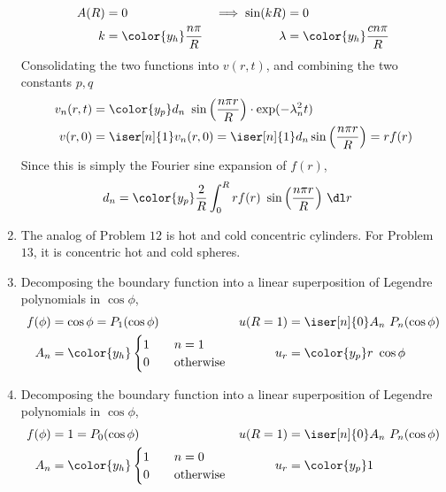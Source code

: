 \begin{enumerate}
\begin{align}
              A(R)              & = 0                           &
              \implies \sin(kR) & = 0                             \\
              k                 & = \color{y_h} \frac{n\pi}{R}  &
              \lambda           & = \color{y_h} \frac{cn\pi}{R}
          \end{align}
          Consolidating the two functions into $ v(r, t) $, and combining the two
          constants $ p, q $
          \begin{align}
              v_n(r, t) & = \color{y_p} d_n\ \sin\Big( \frac{n\pi r}{R}\Big) \cdot
              \exp(-\lambda_n^2 t)                                                 \\
              v(r, 0)   & = \iser[n]{1} v_n(r, 0) = \iser[n]{1} d_n \sin\Big(
              \frac{n\pi r}{R} \Big) = rf(r)
          \end{align}
          Since this is simply the Fourier sine expansion of $ f(r) $,
          \begin{align}
              d_n & = \color{y_p} \frac{2}{R} \int_{0}^{R} rf(r)
              \ \sin \Big( \frac{n\pi r}{R} \Big)\ \dl r
          \end{align}

    \item The analog of Problem $12$ is hot and cold concentric cylinders. For
          Problem $ 13 $, it is concentric hot and cold spheres.

    \item Decomposing the boundary function into a linear superposition of
          Legendre polynomials in $ \cos\phi $,
          \begin{align}
              f(\phi) & = \cos\phi = P_1(\cos\phi)       &
              u(R=1)  & = \iser[n]{0} A_n\ P_n(\cos\phi)         \\
              A_n     & = \color{y_h} \begin{cases}
                                          1 & \quad n = 1            \\
                                          0 & \quad \text{otherwise}
                                      \end{cases}    &
              u_r     & = \color{y_p} r\ \cos\phi
          \end{align}

    \item Decomposing the boundary function into a linear superposition of
          Legendre polynomials in $ \cos\phi $,
          \begin{align}
              f(\phi) & = 1 = P_0(\cos\phi)              &
              u(R=1)  & = \iser[n]{0} A_n\ P_n(\cos\phi)         \\
              A_n     & = \color{y_h} \begin{cases}
                                          1 & \quad n = 0            \\
                                          0 & \quad \text{otherwise}
                                      \end{cases}    &
              u_r     & = \color{y_p} 1
          \end{align}


\end{enumerate}
